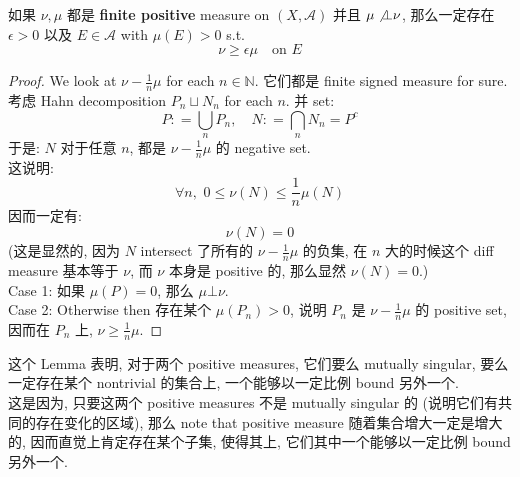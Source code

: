 \documentclass[lang=cn,11pt]{elegantbook}
\begin{document}
\begin{lemma}
    如果 $\nu,\mu$ 都是 \textbf{finite positive} measure on $(X,\mathcal{A})$ 并且 $\mu \not \bot \nu$, 那么一定存在 $\epsilon > 0$ 以及 $E\in \mathcal{A}$ with $\mu(E) > 0$ s.t. \[
    \nu \geq \epsilon \mu\quad \text{on }E 
    \]
\end{lemma}
\begin{proof}
We look at $\nu - \frac{1}{n}\mu$ for each $n \in \mathbb{N}$. 它们都是 finite signed measure for sure.\\
考虑 Hahn decomposition $P_n \sqcup N_n$ for each $n$. 并 set: \[
P : = \bigcup_n P_n,\quad N : = \bigcap_n N_n = P^c
\]
于是: $N$ 对于任意 $n$, 都是 $\nu - \frac{1}{n}\mu$ 的 negative set.\\
这说明: \[
\forall n,\,\, 0 \leq \nu(N) \leq  \frac{1}{n} \mu(N)
\]
因而一定有: \[
\nu(N) = 0
\]
(这是显然的, 因为 $N$ intersect 了所有的 $\nu - \frac{1}{n}\mu$ 的负集, 在 $n$ 大的时候这个 diff measure 基本等于 $\nu$, 而 $\nu$ 本身是 positive 的, 那么显然 $\nu(N) = 0$.)\\
Case 1: 如果 $\mu(P) = 0$, 那么 $\mu \bot \nu$.\\
Case 2: Otherwise then 存在某个 $\mu(P_n) > 0$, 说明 $P_n$ 是  $\nu - \frac{1}{n} \mu$ 的 positive set, 因而在 $P_n$ 上, $\nu \geq \frac{1}{n} \mu$.
\end{proof}
这个 Lemma 表明, 对于两个 positive measures, 它们要么 mutually singular, 要么一定存在某个 nontrivial 的集合上, 一个能够以一定比例 bound 另外一个. \\
这是因为, 只要这两个 positive measures 不是 mutually singular 的 (说明它们有共同的存在变化的区域), 那么 note that positive measure 随着集合增大一定是增大的, 因而直觉上肯定存在某个子集, 使得其上, 它们其中一个能够以一定比例 bound 另外一个.\\
\end{document}
